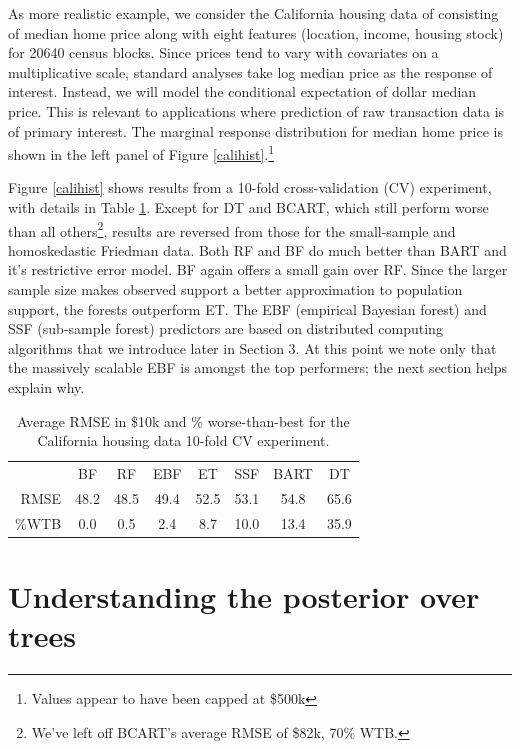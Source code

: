 \documentclass{article}
\begin{document}
As more realistic example, we consider the California housing data of \citet{calidata}
consisting of median home price along with eight features (location, income, housing stock) for 20640  census blocks. Since prices tend to vary with covariates on a multiplicative scale, standard analyses take  log median price as the response of
interest.  Instead, we will model the conditional expectation of
dollar median price.  This is relevant to applications where prediction of raw transaction data is of primary interest.  The marginal response distribution for median home price is shown in the left panel of  Figure \ref{calihist}.\footnote{Values appear to have been capped at \$500k}



Figure \ref{calihist} shows results from a 10-fold cross-validation (CV)
experiment, with details in Table \ref{calitab}.  
Except for DT and BCART, which still perform worse than all 
others\footnote{We've left off BCART's average RMSE of \$82k, 70\% WTB.},
 results are reversed from those for the small-sample and homoskedastic Friedman data.
Both RF and BF do much better than BART and it's
restrictive error model.   BF again offers a small
gain over RF.   Since the larger sample size makes observed support a better approximation to population support,  the forests outperform ET.  The EBF (empirical Bayesian forest) and SSF (sub-sample forest) predictors are based on distributed computing algorithms that we introduce later in Section 3.  At this point we note only that the massively scalable EBF is amongst the top performers; the next section helps explain why.


\begin{table}[h]\hspace{-.25cm}
{\footnotesize
\begin{tabular}{r|c c c c c c c}
&BF  &  RF &   EBF &  ET &   SSF &  BART & DT %
\\ \cline{2-8}\rule{0pt}{3ex}
RMSE &  48.2 &   48.5 &   49.4 &   52.5 &   53.1 &   54.8 &   65.6   %
\\ \%WTB & 0.0& 0.5& 2.4& 8.7&10.0&13.4&35.9%
\end{tabular}}
\caption{\label{calitab} Average RMSE in \$10k and \% worse-than-best 
 for the California housing data 10-fold CV experiment.}
\end{table}

    
    

\section{Understanding the posterior over trees}\label{treeuncertainty}
\end{document}

